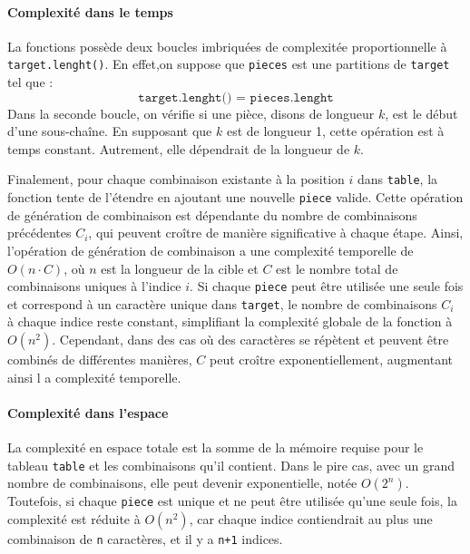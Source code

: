 \documentclass[9pt]{report}
\begin{document}
  \paragraph{Complexité dans le temps}
  La fonctions possède deux boucles imbriquées de complexitée proportionnelle à
  \texttt{target.lenght()}. En effet,on suppose que \texttt{pieces} est une partitions de \texttt{target}   
  tel que :
  \[ \texttt{target.lenght() = pieces.lenght}  \]
  Dans la seconde boucle, on vérifie si une pièce, disons de longueur $k$, 
  est le début d'une sous-chaîne. En supposant que $k$ est de longueur 1, cette opération 
  est à temps constant. Autrement, elle dépendrait de la longueur de $k$.


  Finalement, pour chaque combinaison existante à la position $i$ dans \texttt{table}, 
  la fonction tente de l'étendre en ajoutant une nouvelle \texttt{piece} valide. 
  Cette opération de génération de combinaison est dépendante du nombre de
  combinaisons précédentes $C_i$, qui peuvent croître de manière significative 
  à chaque étape. Ainsi, l'opération de génération de combinaison a une 
  complexité temporelle de $O(n \cdot C)$, où $n$ est la longueur de la 
  cible et $C$ est le nombre total de combinaisons uniques à l'indice $i$. 
  Si chaque \texttt{piece} peut être utilisée une seule fois et correspond 
  à un caractère unique dans \texttt{target}, le nombre de combinaisons $C_i$ 
  à chaque indice reste constant, simplifiant la complexité globale de la fonction à $O(n^2)$.
  Cependant, dans des cas où des caractères se répètent et peuvent être combinés de
  différentes manières, $C$ peut croître exponentiellement, augmentant ainsi l
  a complexité temporelle.


  \paragraph{Complexité dans l'espace}
  La complexité en espace totale est la somme de la mémoire requise pour le tableau 
  \texttt{table} et les combinaisons qu'il contient. Dans le pire cas, avec un grand nombre de 
  combinaisons, elle peut devenir exponentielle, notée \( O(2^n) \). Toutefois, si chaque 
  \texttt{piece} est unique et ne peut être utilisée qu'une seule fois, la complexité est 
  réduite à \( O(n^2) \), car chaque indice contiendrait au plus une combinaison de \texttt{n} 
  caractères, et il y a \texttt{n+1} indices.
\end{document}

